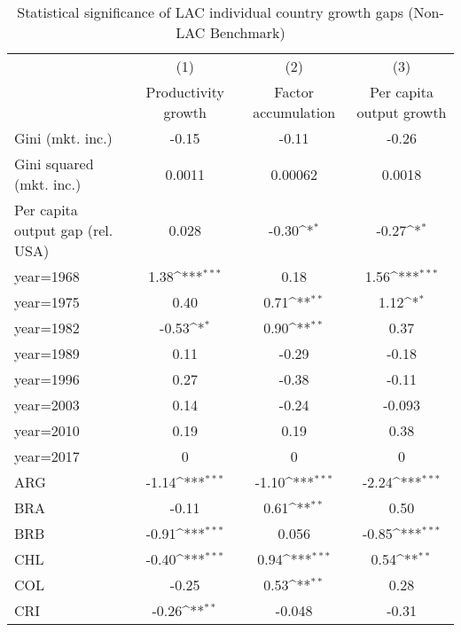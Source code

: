 \begin{sidewaystable}[htbp]\centering
\def\sym#1{\ifmmode^{#1}\else\(^{#1}\)\fi}
\caption{Statistical significance of LAC individual country growth gaps (Non-LAC Benchmark)}
\begin{tabular}{l*{3}{c}}
\toprule
                &\multicolumn{1}{c}{(1)}&\multicolumn{1}{c}{(2)}&\multicolumn{1}{c}{(3)}\\
                &\multicolumn{1}{c}{Productivity growth}&\multicolumn{1}{c}{Factor accumulation}&\multicolumn{1}{c}{Per capita output growth}\\
\midrule
Gini (mkt. inc.)&    -0.15         &    -0.11         &    -0.26         \\
Gini squared (mkt. inc.)&   0.0011         &  0.00062         &   0.0018         \\
Per capita output gap (rel. USA)&    0.028         &    -0.30\sym{*}  &    -0.27\sym{*}  \\
year=1968       &     1.38\sym{***}&     0.18         &     1.56\sym{***}\\
year=1975       &     0.40         &     0.71\sym{**} &     1.12\sym{*}  \\
year=1982       &    -0.53\sym{*}  &     0.90\sym{**} &     0.37         \\
year=1989       &     0.11         &    -0.29         &    -0.18         \\
year=1996       &     0.27         &    -0.38         &    -0.11         \\
year=2003       &     0.14         &    -0.24         &   -0.093         \\
year=2010       &     0.19         &     0.19         &     0.38         \\
year=2017       &        0         &        0         &        0         \\
ARG             &    -1.14\sym{***}&    -1.10\sym{***}&    -2.24\sym{***}\\
BRA             &    -0.11         &     0.61\sym{**} &     0.50         \\
BRB             &    -0.91\sym{***}&    0.056         &    -0.85\sym{***}\\
CHL             &    -0.40\sym{***}&     0.94\sym{***}&     0.54\sym{**} \\
COL             &    -0.25         &     0.53\sym{**} &     0.28         \\
CRI             &    -0.26\sym{**} &   -0.048         &    -0.31         \\

\end{tabular}
\end{sidewaystable}
